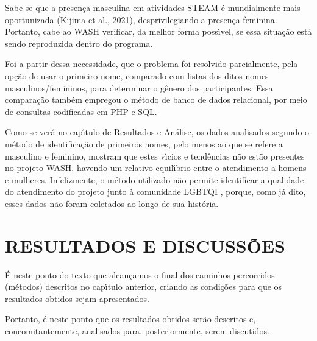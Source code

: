 \documentclass[
12pt,		%
openright,	%
twoside,  %
a4paper,			%
chapter=TITLE,		%
english,			%
french,				%
spanish,			%
brazil				%
]{USPSC-classe/USPSC}
\begin{document}
Sabe-se que a presen\c{c}a masculina em atividades STEAM \'e mundialmente mais oportunizada  (Kijima et al., 2021),  desprivilegiando a presen\c{c}a feminina. Portanto, cabe ao WASH verificar, da melhor forma poss\'{\i}vel, se essa situa\c{c}\~ao est\'a sendo reproduzida dentro do programa.










Foi a partir dessa necessidade, que o problema foi resolvido parcialmente, pela op\c{c}\~ao de usar o primeiro nome, comparado com listas dos ditos nomes masculinos/femininos, para determinar o g\^enero dos participantes. Essa compara\c{c}\~ao tamb\'em empregou o m\'etodo de banco de dados relacional, por meio de consultas codificadas em PHP e SQL.










Como se ver\'a no cap\'{\i}tulo de Resultados e An\'alise, os dados analisados segundo o m\'etodo de identifica\c{c}\~ao de primeiros nomes, pelo menos ao que se refere a masculino e feminino, mostram que estes v\'{\i}cios e tend\^encias n\~ao est\~ao presentes no projeto WASH, havendo um relativo equil\'{\i}brio entre o atendimento a homens e mulheres. Infelizmente, o m\'etodo utilizado n\~ao permite identificar a qualidade do atendimento do projeto junto \`a comunidade LGBTQI , porque, como j\'a dito, esses dados n\~ao foram coletados ao longo de sua hist\'oria.










\chapter[RESULTADOS E DISCUSS\~OES]{RESULTADOS E DISCUSS\~OES}\label{RESULTADOS E DISCUSS\~OES}
\'E neste ponto do texto que alcan\c{c}amos o final dos caminhos percorridos (m\'etodos) descritos no cap\'{\i}tulo anterior, criando as condi\c{c}\~oes para que os resultados obtidos sejam apresentados.










Portanto, \'e neste ponto que os resultados obtidos ser\~ao descritos e, concomitantemente, analisados para, posteriormente, serem discutidos.
\end{document}
